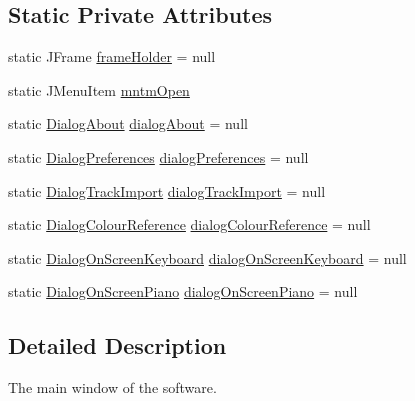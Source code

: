 \subsection*{Static Private Attributes}
\begin{DoxyCompactItemize}
\item 
static J\+Frame \hyperlink{classcom_1_1lclion_1_1midigui_1_1_j_frame_m_i_d_i_piano_sheet_creator_acbbeb368af441422247853ca2d6641c4}{frame\+Holder} = null
\item 
static J\+Menu\+Item \hyperlink{classcom_1_1lclion_1_1midigui_1_1_j_frame_m_i_d_i_piano_sheet_creator_a96b3e2db6919b4449aca72fc9a20b980}{mntm\+Open}
\item 
static \hyperlink{classcom_1_1lclion_1_1midigui_1_1_dialog_about}{Dialog\+About} \hyperlink{classcom_1_1lclion_1_1midigui_1_1_j_frame_m_i_d_i_piano_sheet_creator_a047d953d878b28ab2a2807642ea76766}{dialog\+About} = null
\item 
static \hyperlink{classcom_1_1lclion_1_1midigui_1_1_dialog_preferences}{Dialog\+Preferences} \hyperlink{classcom_1_1lclion_1_1midigui_1_1_j_frame_m_i_d_i_piano_sheet_creator_ab8f21a3b29b7b03f47d37ab0be98d7a5}{dialog\+Preferences} = null
\item 
static \hyperlink{classcom_1_1lclion_1_1midigui_1_1_dialog_track_import}{Dialog\+Track\+Import} \hyperlink{classcom_1_1lclion_1_1midigui_1_1_j_frame_m_i_d_i_piano_sheet_creator_a779c5b2f4e1dcc94515f3e174380101c}{dialog\+Track\+Import} = null
\item 
static \hyperlink{classcom_1_1lclion_1_1midigui_1_1_dialog_colour_reference}{Dialog\+Colour\+Reference} \hyperlink{classcom_1_1lclion_1_1midigui_1_1_j_frame_m_i_d_i_piano_sheet_creator_ab5e923b68d49fe2353d6b88660db06d5}{dialog\+Colour\+Reference} = null
\item 
static \hyperlink{classcom_1_1lclion_1_1midigui_1_1_dialog_on_screen_keyboard}{Dialog\+On\+Screen\+Keyboard} \hyperlink{classcom_1_1lclion_1_1midigui_1_1_j_frame_m_i_d_i_piano_sheet_creator_a381bf6ccecb17ef281f31251e09e2a10}{dialog\+On\+Screen\+Keyboard} = null
\item 
static \hyperlink{classcom_1_1lclion_1_1midigui_1_1_dialog_on_screen_piano}{Dialog\+On\+Screen\+Piano} \hyperlink{classcom_1_1lclion_1_1midigui_1_1_j_frame_m_i_d_i_piano_sheet_creator_a03a695600b98ed60aef1c2d5339abcf9}{dialog\+On\+Screen\+Piano} = null
\end{DoxyCompactItemize}


\subsection{Detailed Description}
The main window of the software. 

